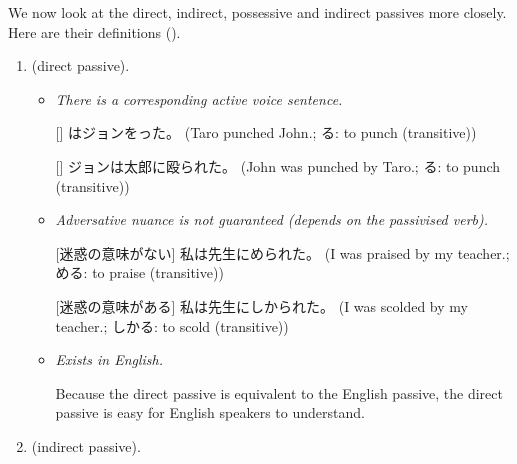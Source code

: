 \documentclass[../nihongo-gakushuu-kyouzai.tex]{subfiles}
\begin{document}

We now look at the direct, indirect, possessive and indirect passives more closely. Here are their definitions ().
\begin{enumerate}[label=\arabic*.]
    \item \textbf{} (direct passive).


    \begin{itemize}
        \item \emph{There is a corresponding active voice sentence.}

        [] はジョンをった。 (Taro punched John.; る: to punch (transitive))

        [] ジョンは太郎に殴られた。 (John was punched by Taro.; る: to punch (transitive))

        \item \emph{Adversative nuance is not guaranteed (depends on the passivised verb).}

        [迷惑の意味がない] 私は先生にめられた。 (I was praised by my teacher.; める: to praise (transitive))

        [迷惑の意味がある] 私は先生にしかられた。 (I was scolded by my teacher.; しかる: to scold (transitive))

        \item \emph{Exists in English.}

        Because the direct passive is equivalent to the English passive, the direct passive is easy for English speakers to understand.
    \end{itemize}
    \item \textbf{} (indirect passive).




\end{enumerate}
\end{document}
